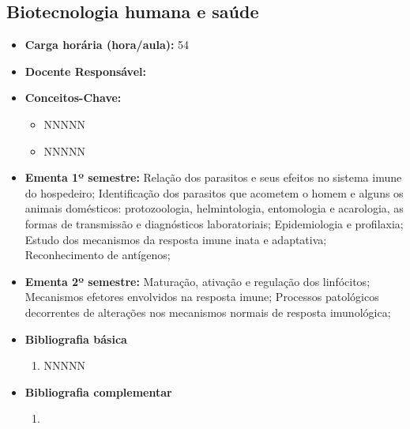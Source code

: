 \documentclass[11pt,fleqn]{book} %
\begin{document}
\subsection{Biotecnologia humana e saúde}\label{disc:biotecSaude}
\begin{itemize}
	\item \textbf{Carga horária (hora/aula):} 54
	\item \textbf{Docente Responsável:}
	\item \textbf{Conceitos-Chave:}
	\begin{itemize}
		\item NNNNN
		\item NNNNN
	\end{itemize}
	\item \textbf{Ementa 1º semestre:}	
	Relação dos parasitos e seus efeitos no sistema imune do hospedeiro; 
	Identificação dos parasitos que acometem o homem e alguns os animais domésticos: protozoologia, helmintologia, entomologia e acarologia, as formas de transmissão e diagnósticos laboratoriais; 
	Epidemiologia e profilaxia; 
	Estudo dos mecanismos da resposta imune inata e adaptativa; 
	Reconhecimento de antígenos; 
	\item \textbf{Ementa 2º semestre:}		
	Maturação, ativação e regulação dos linfócitos;
	Mecanismos efetores envolvidos na resposta imune;
	Processos patológicos decorrentes de alterações nos mecanismos normais de resposta imunológica;
	\item \textbf{Bibliografia básica}
	\begin{enumerate}
		\item NNNNN
	\end{enumerate}
	\item \textbf{Bibliografia complementar}
	\begin{enumerate}
		\item 
	\end{enumerate}	
\end{itemize}


\newpage
\end{document}
